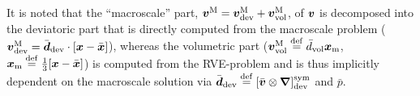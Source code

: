 \documentclass[10pt,a4paper]{article}
\newcommand{\particle}{\mathrm{part}}
\newcommand{\segment}{\mathrm{segm}}
\newcommand{\corner}{\mathrm{corn}}
\begin{document}

It is noted that the ``macroscale'' part, $\boldsymbol{v}^{\mathrm{M}}=\boldsymbol{v}^{\mathrm{M}}_{\mathrm{dev}}+\boldsymbol{v}^{\mathrm{M}}_{\mathrm{vol}}$, of $\boldsymbol{v}$ is decomposed into the deviatoric part that is directly computed from the macroscale problem ($\boldsymbol{v}^{\mathrm{M}}_{\mathrm{dev}}=\bar{\boldsymbol{d}}_{\mathrm{dev}}\cdot[\boldsymbol{x}-\bar{\boldsymbol{x}}]$), whereas the volumetric part ($\boldsymbol{v}^{\mathrm{M}}_{\mathrm{vol}}\overset{\mathrm{def}}{=}\bar{d}_{\mathrm{vol}}\boldsymbol{x}_{\mathrm{m}}$, $\boldsymbol{x}_{\mathrm{m}} \overset{\mathrm{def}}{=} \frac13[\boldsymbol{x}-\bar{\boldsymbol{x}}]$) is computed from the RVE-problem and is thus implicitly dependent on the macroscale solution via $\bar{\boldsymbol{d}}_{\mathrm{dev}}\overset{\mathrm{def}}{=}[\bar{\boldsymbol{v}}\mathbin{\otimes}\boldsymbol{\nabla}]^{\mathrm{sym}}_{\mathrm{dev}}$ and $\bar{p}$.
\end{document}
